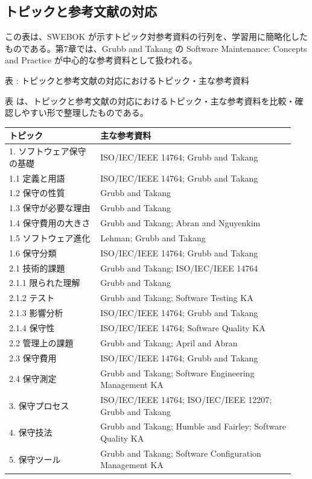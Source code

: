 \subsection{トピックと参考文献の対応}
この表は、SWEBOK が示すトピック対参考資料の行列を、学習用に簡略化したものである。第7章では、Grubb and Takang の Software Maintenance: Concepts and Practice が中心的な参考資料として扱われる。\par
\par\smallskip\noindent{}\label{tab:ch07-15}表 \thetable: トピックと参考文献の対応におけるトピック・主な参考資料\par\smallskip
表 \thetable は、トピックと参考文献の対応におけるトピック・主な参考資料を比較・確認しやすい形で整理したものである。\par\smallskip
\begin{longtable}{p{0.30\linewidth}p{0.64\linewidth}}
\toprule
トピック & 主な参考資料 \\
\midrule
\endhead
1. ソフトウェア保守の基礎 & ISO/IEC/IEEE 14764; Grubb and Takang \\
1.1 定義と用語 & ISO/IEC/IEEE 14764; Grubb and Takang \\
1.2 保守の性質 & Grubb and Takang \\
1.3 保守が必要な理由 & Grubb and Takang \\
1.4 保守費用の大きさ & Grubb and Takang; Abran and Nguyenkim \\
1.5 ソフトウェア進化 & Lehman; Grubb and Takang \\
1.6 保守分類 & ISO/IEC/IEEE 14764; Grubb and Takang \\
2.1 技術的課題 & Grubb and Takang; ISO/IEC/IEEE 14764 \\
2.1.1 限られた理解 & Grubb and Takang \\
2.1.2 テスト & Grubb and Takang; Software Testing KA \\
2.1.3 影響分析 & ISO/IEC/IEEE 14764; Grubb and Takang \\
2.1.4 保守性 & ISO/IEC/IEEE 14764; Software Quality KA \\
2.2 管理上の課題 & Grubb and Takang; April and Abran \\
2.3 保守費用 & ISO/IEC/IEEE 14764; Grubb and Takang \\
2.4 保守測定 & Grubb and Takang; Software Engineering Management KA \\
3. 保守プロセス & ISO/IEC/IEEE 14764; ISO/IEC/IEEE 12207; Grubb and Takang \\
4. 保守技法 & Grubb and Takang; Humble and Fairley; Software Quality KA \\
5. 保守ツール & Grubb and Takang; Software Configuration Management KA \\
\bottomrule
\end{longtable}
